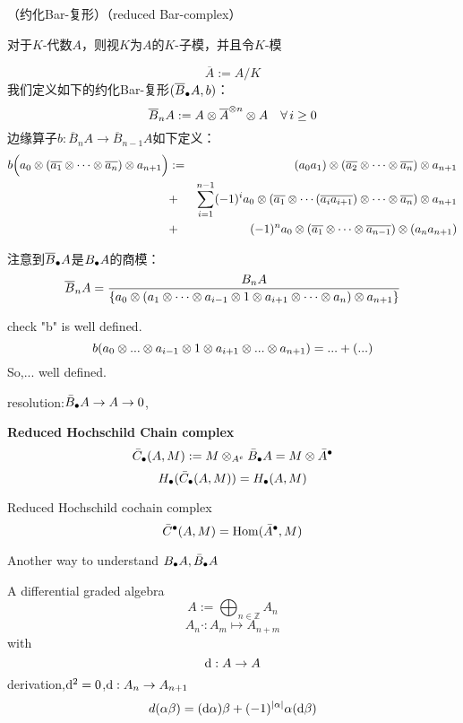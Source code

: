 \begin{definition}（约化Bar-复形）（reduced Bar-complex）

对于$K$-代数$A$，则视$K$为$A$的$K$-子模，并且令$K$-模

$$\overline{A}:=A/K$$
我们定义如下的约化Bar-复形$(\overline{B}_{\bullet} A,b)$：
$$\overline{B}_n A:=A\otimes \overline{A}^{\otimes n}\otimes A
\quad \forall \,i\geq 0$$
边缘算子$b:\overline{B}_n A\to \overline{B}_{n-1} A$如下定义：
\begin{eqnarray*}
b\Big(a_0\otimes(\overline{a_1}\otimes\cdots\otimes \overline{a_n})\otimes a_{n+1}\Big)
&:=&
 (a_0a_1)\otimes(\overline{a_2}\otimes\cdots\otimes\overline{a_n})\otimes a_{n+1}\\
&+ &
 \sum_{i=1}^{n-1}(-1)^ia_0\otimes
    (\overline{a_1}\otimes\cdots
    (\overline{a_ia_{i+1}})\otimes\cdots\otimes \overline{a_n})
    \otimes a_{n+1}\\
&+ &(-1)^n
 a_0\otimes(\overline{a_1}\otimes\cdots\otimes \overline{a_{n-1}})
   \otimes(a_na_{n+1})
\end{eqnarray*}
\end{definition}

注意到$\overline{B}_{\bullet} A$是$B_{\bullet} A$的商模：
$$\overline{B}_nA=
     \frac{B_n A}
     {\{a_0\otimes(a_1\otimes\cdots
     \otimes a_{i-1}\otimes 1\otimes a_{i+1}
     \otimes\cdots\otimes a_n)\otimes a_{n+1}\}
     }
$$

check "b" is well defined.
$$b(a_0\otimes...\otimes a_{i-1}\otimes 1\otimes a_{i+1}\otimes...\otimes a_{n+1})
=...+(...)$$
So,... well defined.

resolution:$\bar{B}_{\bullet} A\to A\to 0$,

\textbf{Reduced Hochschild Chain complex}
$$\bar{C}_{\bullet}(A,M):=M\otimes_{A^e}\bar{B}_{\bullet} A=M\otimes\bar{A}^{\bullet}$$
$$H_{\bullet}(\bar{C}_{\bullet}(A,M))=H_{\bullet}(A,M)$$

Reduced Hochschild cochain complex
$$\bar{C}^{\bullet}(A,M)=\operatorname{Hom}(\bar{A}^{\bullet},M)$$

Another way to understand $B_{\bullet} A,\bar{B}_{\bullet} A$

\begin{definition}
A differential graded algebra
$$A:=\bigoplus_{n\in\mathbb{Z}}A_n$$
$$A_n\cdot:A_m\mapsto A_{n+m}$$
with
$$\mathrm{d}:A\to A$$
derivation,$\mathrm{d}^2=0$,$\mathrm{d}:A_n\to A_{n+1}$
$$d(\alpha\beta)=(\mathrm{d}\alpha)\beta+(-1)^{|\alpha|}\alpha(\mathrm{d}\beta)$$
\end{definition}


